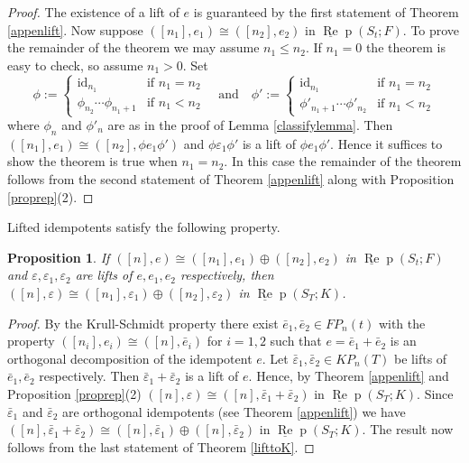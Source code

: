 \documentclass{amsart}
\newtheorem{proposition}[theorem]{Proposition}
\theoremstyle{definition}
\newcommand{\id}{\text{id}}
\def\uRep{\underline{\operatorname{Re}}\!\operatorname{p}}
\renewcommand{\1}{_{(1)}}
\renewcommand{\2}{_{(2)}}
\newcommand{\3}{_{(3)}}
\newcommand{\4}{_{(4)}}
\newcommand{\ep}{\varepsilon}
\begin{document}
\begin{proof} The existence of a lift of $e$ is guaranteed by the first statement of Theorem \ref{appenlift}.  Now suppose $([n_1], e_1)\cong([n_2], e_2)$ in $\uRep(S_t; F)$.  To prove the remainder of the theorem we may assume $n_1\leq n_2$.  If $n_1=0$ the theorem is easy to check, so assume $n_1>0$.  Set $$\phi:=\left\{\begin{array}{ll}\id_{n_1} & \text{if }n_1=n_2 \\
\phi_{n_2}\cdots\phi_{n_1+1} & \text{if }n_1<n_2
\end{array}\right.\quad\text{and}\quad \phi':=\left\{\begin{array}{ll}\id_{n_1} & \text{if }n_1=n_2 \\
\phi'_{n_1+1}\cdots\phi'_{n_2} & \text{if }n_1<n_2
\end{array}\right.$$ where $\phi_{n}$ and $\phi'_{n}$ are as in the proof of Lemma \ref{classifylemma}.  Then $([n_1], e_1)\cong([n_2], \phi e_1\phi')$ and $\phi\ep_1\phi'$ is a lift of $\phi e_1\phi'$.  Hence it suffices to show the theorem is true when $n_1=n_2$.  
In this case the remainder of the theorem follows from the second statement of Theorem \ref{appenlift} along with Proposition \ref{proprep}(2).  
\end{proof}

Lifted idempotents satisfy the following property.

\begin{proposition}\label{liftsums} If $([n], e)\cong ([n_1], e_1)\oplus([n_2], e_2)$ in $\uRep(S_t; F)$ and $\ep, \ep_1, \ep_2$ are lifts of $e, e_1, e_2$ respectively, then $([n], \ep)\cong([n_1], \ep_1)\oplus([n_2], \ep_2)$ in $\uRep(S_T; K)$.
\end{proposition}

\begin{proof} By the Krull-Schmidt property there exist $\bar{e}_1, \bar{e}_2\in FP_n(t)$ with the property $([n_i] , e_i)\cong ([n], \bar{e}_i)$ for $i=1,2$ such that $e=\bar{e}_1+\bar{e}_2$ is an orthogonal decomposition of the idempotent $e$.  Let $\bar{\ep}_1, \bar{\ep}_2\in KP_n(T)$ be lifts of $\bar{e}_1, \bar{e}_2$ respectively.  Then  $\bar{\ep}_1+\bar{\ep}_2$ is a lift of $e$.  Hence, by Theorem \ref{appenlift} and Proposition \ref{proprep}(2) $([n], \ep)\cong([n], \bar{\ep}_1+\bar{\ep}_2)$ in $\uRep(S_T; K)$.  Since $\bar{\ep}_1$ and $\bar{\ep}_2$ are orthogonal idempotents (see Theorem \ref{appenlift}) we have $([n], \bar{\ep}_1+\bar{\ep}_2)\cong([n], \bar{\ep}_1)\oplus([n], \bar{\ep}_2)$ in $\uRep(S_T; K)$.  The result now follows from the last statement of Theorem \ref{lifttoK}.
\end{proof}
\end{document}
